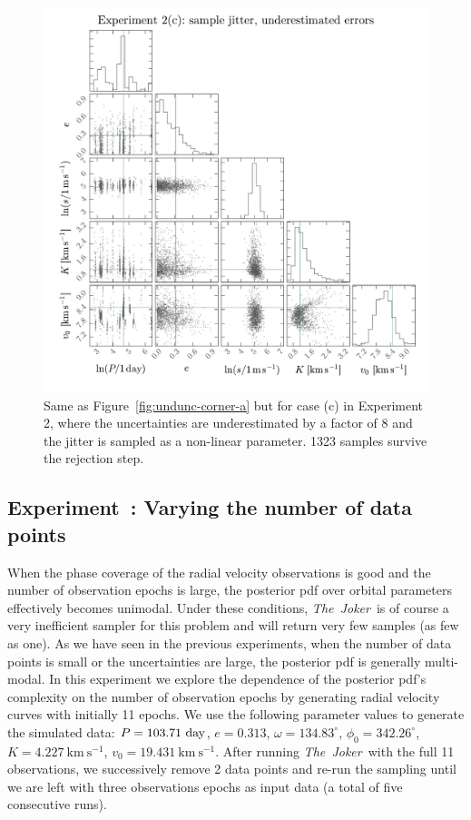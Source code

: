\documentclass[manuscript, letterpaper]{aastex6}
\newcommand{\project}[1]{\textsl{#1}}
\newcommand{\samplername}{\project{The~Joker}}
\newcommand{\figname}{Figure}
\newcommand{\kms}{\mathrm{km}~\mathrm{s}^{-1}}
\newcounter{expcounter}
\begin{document}
\begin{figure}[p]
\begin{center}
\includegraphics[width=\textwidth]{figures/undunc-corner-c.pdf}
\end{center}
\caption{%
Same as \figname~\ref{fig:undunc-corner-a} but for case (c) in Experiment 2, where the
uncertainties are underestimated by a factor of 8 and the jitter is sampled as
a non-linear parameter.
1323 samples survive the rejection step.
\label{fig:undunc-corner-c}}
\end{figure}

\subsection{Experiment~: Varying the number of data points}
\label{sec:numpts}

When the phase coverage of the radial velocity observations is good and the
number of observation epochs is large, the posterior pdf over orbital parameters
effectively becomes unimodal.
Under these conditions, \samplername\ is of course a very inefficient sampler for this
problem and will return very few samples (as few as one).
As we have seen in the previous experiments, when the number of data points is
small or the uncertainties are large, the posterior pdf is generally
multi-modal.
In this experiment we explore the dependence of the posterior pdf's complexity
on the number of observation epochs by generating radial velocity curves with
initially 11 epochs.
We use the following parameter values to generate the simulated data: $P =
103.71~{\rm day}$, $e = 0.313$, $\omega = 134.83^\circ$, $\phi_0 =
342.26^\circ$, $K = 4.227~\kms$, $v_0 = 19.431~\kms$.
After running \samplername\ with the full 11 observations, we successively
remove 2 data points and re-run the sampling until we are left with three
observations epochs as input data (a total of five consecutive runs).
\end{document}
